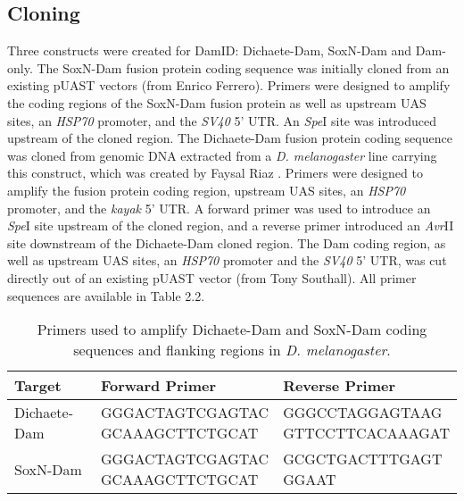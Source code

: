 \subsection{Cloning}
Three constructs were created for DamID: Dichaete-Dam, SoxN-Dam and Dam-only. The SoxN-Dam fusion protein coding sequence was initially cloned from an existing pUAST vectors (from Enrico Ferrero). Primers were designed to amplify the coding regions of the SoxN-Dam fusion protein as well as upstream UAS sites, an \emph{HSP70} promoter, and the \emph{SV40} 5' UTR. An \emph{Spe}I site was introduced upstream of the cloned region. The Dichaete-Dam fusion protein coding sequence was cloned from genomic DNA extracted from a \emph{D. melanogaster} line carrying this construct, which was created by Faysal Riaz \citep{riaz_phd}. Primers were designed to amplify the fusion protein coding region, upstream UAS sites, an \emph{HSP70} promoter, and the \emph{kayak} 5' UTR. A forward primer was used to introduce an \emph{Spe}I site upstream of the cloned region, and a reverse primer introduced an \emph{Avr}II site downstream of the Dichaete-Dam cloned region. The Dam coding region, as well as upstream UAS sites, an \emph{HSP70} promoter and the \emph{SV40} 5' UTR, was cut directly out of an existing pUAST vector (from Tony Southall). All primer sequences are available in Table 2.2. 

\begin{table}[h]
\centering
\begin{tabular}{|l|p{5cm}|p{5cm}|}
\hline
\textbf{Target}       & \textbf{Forward Primer}                  & \textbf{Reverse Primer}                  \\ \hline
Dichaete-Dam & \parbox[t]{5cm}{GGGACTAGTCGAGTAC\\ GCAAAGCTTCTGCAT} & \parbox[t]{4cm}{GGGCCTAGGAGTAAG\\ GTTCCTTCACAAAGAT} \\ \hline
SoxN-Dam     & \parbox[t]{5cm}{GGGACTAGTCGAGTAC\\ GCAAAGCTTCTGCAT} & \parbox[t]{4cm}{GCGCTGACTTTGAGT\\ GGAAT} \\ \hline          
\end{tabular}
\caption{Primers used to amplify Dichaete-Dam and SoxN-Dam coding sequences and flanking regions in \emph{D. melanogaster}.}
\label{Table 2.2}
\end{table}

